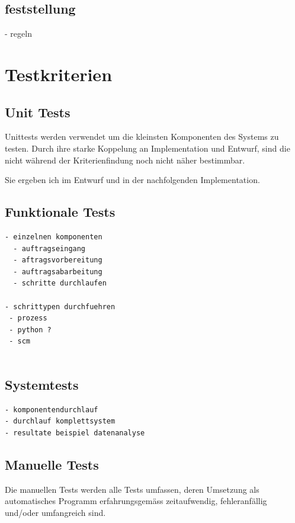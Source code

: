 \subsection{feststellung}
 - regeln


\section{Testkriterien}
\subsection{Unit Tests}

Unittests werden verwendet um die kleinsten Komponenten des Systems zu testen.
Durch ihre starke Koppelung an Implementation und Entwurf,
sind die nicht w\"ahrend der Kriterienfindung noch nicht n\"aher bestimmbar.

Sie ergeben ich im Entwurf und in der nachfolgenden Implementation.

\subsection{Funktionale Tests}

\begin{verbatim}
- einzelnen komponenten
  - auftragseingang
  - aftragsvorbereitung
  - auftragsabarbeitung
  - schritte durchlaufen

- schrittypen durchfuehren
 - prozess
 - python ?
 - scm


\end{verbatim}

\subsection{Systemtests}

\begin{verbatim}
- komponentendurchlauf
- durchlauf komplettsystem
- resultate beispiel datenanalyse

\end{verbatim}

\subsection{Manuelle Tests}

Die manuellen Tests werden alle Tests umfassen,
deren Umsetzung als automatisches Programm erfahrungsgem\"ass zeitaufwendig,
fehleranf\"allig und/oder umfangreich sind.


